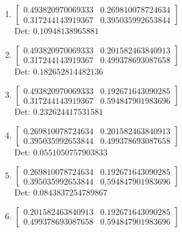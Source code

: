 \documentclass[12pt]{article}
\begin{document}
\begin{enumerate}

\item $\displaystyle \left[\begin{matrix}0.493820970069333 & 0.269810078724634\\0.317244143919367 & 0.395035992653844\end{matrix}\right]$\\

Det: $0.10948138965881$\\

\item $\displaystyle \left[\begin{matrix}0.493820970069333 & 0.201582463840913\\0.317244143919367 & 0.499378693087658\end{matrix}\right]$\\

Det: $0.182652814482136$\\

\item $\displaystyle \left[\begin{matrix}0.493820970069333 & 0.192671643090285\\0.317244143919367 & 0.594847901983696\end{matrix}\right]$\\

Det: $0.232624417531581$\\

\item $\displaystyle \left[\begin{matrix}0.269810078724634 & 0.201582463840913\\0.395035992653844 & 0.499378693087658\end{matrix}\right]$\\

Det: $0.0551050757903833$\\

\item $\displaystyle \left[\begin{matrix}0.269810078724634 & 0.192671643090285\\0.395035992653844 & 0.594847901983696\end{matrix}\right]$\\

Det: $0.0843837254789867$\\

\item $\displaystyle \left[\begin{matrix}0.201582463840913 & 0.192671643090285\\0.499378693087658 & 0.594847901983696\end{matrix}\right]$\\


\end{enumerate}
\end{document}
